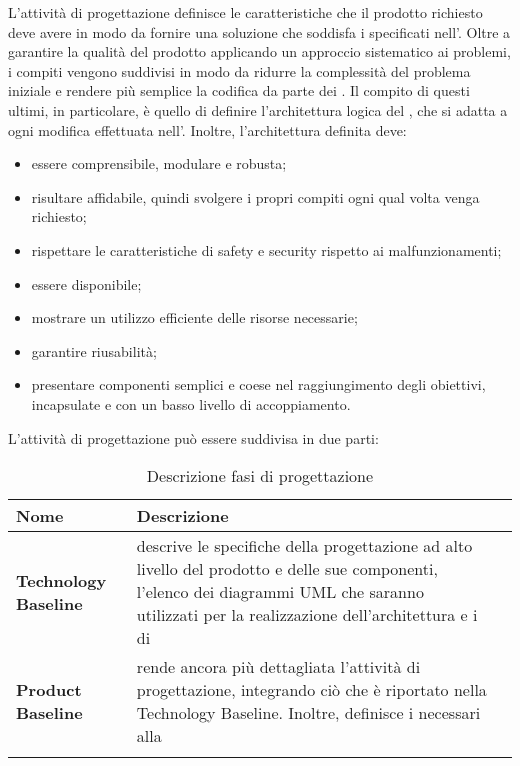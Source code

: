 L'attività di progettazione definisce le caratteristiche che il prodotto richiesto deve avere in modo da fornire una soluzione che soddisfa i  specificati nell'\AdR{}. Oltre a garantire la qualità del prodotto applicando un approccio sistematico ai problemi, i compiti vengono suddivisi in modo da ridurre la complessità del problema iniziale e rendere più semplice la codifica da parte dei \progrs{}. Il compito di questi ultimi, in particolare, è quello di definire l'architettura logica del , che si adatta a ogni modifica effettuata nell'\AdR{}. Inoltre, l'architettura definita deve:
\begin{itemize}
\item essere comprensibile, modulare e robusta;
\item risultare affidabile, quindi svolgere i propri compiti ogni qual volta venga richiesto;
\item rispettare le caratteristiche di safety e security rispetto ai malfunzionamenti;
\item essere disponibile;
\item mostrare un utilizzo efficiente delle risorse necessarie;
\item garantire riusabilità;
\item presentare componenti semplici e coese nel raggiungimento degli obiettivi, incapsulate e con un basso livello di accoppiamento.
\end{itemize}
L'attività di progettazione può essere suddivisa in due parti:

\setlength{\freewidth}{\dimexpr\textwidth-0\tabcolsep}
	\renewcommand{\arraystretch}{1.5}
	\setlength{\aboverulesep}{0pt}
	\setlength{\belowrulesep}{0pt}
	\begin{longtable}{L{.15\freewidth} L{.6\freewidth} L{.080\freewidth}}
		\toprule 
		\textbf{Nome} & \textbf{Descrizione} \\
		\toprule
		\endhead		
		\textbf{Technology Baseline} &  descrive le specifiche della progettazione ad alto livello del prodotto e delle sue componenti, l'elenco dei diagrammi UML che saranno utilizzati per la realizzazione dell'architettura e i  di \\
		\textbf{Product Baseline} & rende ancora più dettagliata l'attività di progettazione, integrando ciò che è riportato nella Technology Baseline. Inoltre, definisce i  necessari alla  \\
		\bottomrule
		\hiderowcolors
		\caption{Descrizione fasi di progettazione}
	\end{longtable}

